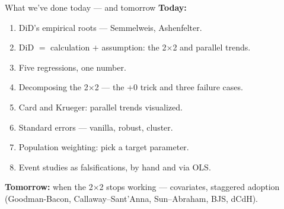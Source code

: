 \documentclass[aspectratio=169,11pt]{beamer}
\begin{document}
\begin{frame}{What we've done today --- and tomorrow}
\vspace{0.3em}
\textbf{Today:}
\begin{enumerate}\small
  \item DiD's empirical roots --- Semmelweis, Ashenfelter.
  \item DiD $=$ calculation $+$ assumption: the 2$\times$2 and parallel trends.
  \item Five regressions, one number.
  \item Decomposing the 2$\times$2 --- the +0 trick and three failure cases.
  \item Card and Krueger: parallel trends visualized.
  \item Standard errors --- vanilla, robust, cluster.
  \item Population weighting: pick a target parameter.
  \item Event studies as falsifications, by hand and via OLS.
\end{enumerate}
\vspace{0.5em}
\textbf{Tomorrow:} when the 2$\times$2 stops working --- covariates, staggered adoption (Goodman-Bacon, Callaway--Sant'Anna, Sun--Abraham, BJS, dCdH).
\end{frame}
\end{document}
